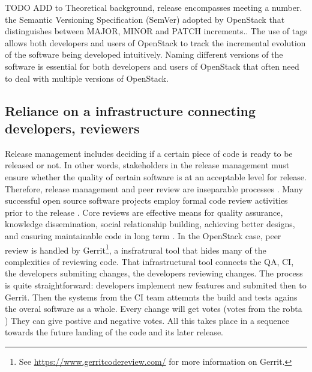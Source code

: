 \documentclass[dvipsnames]{interact}
\theoremstyle{plain}\newtheorem{theorem}{Theorem}[section]
\theoremstyle{definition}
\theoremstyle{remark}
\newenvironment{newStuff}{
    \begin{color}{Sepia}
    \begin{tabular}{|p{1.0\textwidth}|}
    \hline\\
    }
    { 
    \\\\\hline
    \end{tabular} 
    \end{color}
    }
\renewenvironment{newStuff}{}{}
\begin{document}
\begin{newStuff}




\begin{newStuff}
TODO ADD to Theoretical background,  release encompasses  meeting a number. 
the Semantic Versioning Specification (SemVer) adopted by OpenStack that distinguishes between MAJOR, MINOR and PATCH increments.. The use of tags allows both developers and users of OpenStack to track the incremental evolution of the software being developed intuitively. Naming different versions of the software is essential for both developers and users of OpenStack that often need to deal with multiple versions of OpenStack. 


 
 

\end{newStuff}






 
 
\subsection{Reliance on a infrastructure connecting developers, reviewers} 

Release management includes deciding if a certain piece of code is ready to be released or not. In other words, stakeholders in the release management must ensure whether the quality of certain software is at an acceptable level for release. Therefore, release management and peer review are inseparable processes 
\citep[]{Jrgensen2001,SharmaSugumaran_et_al2002,NarayanFinis_et_al2012,StarkOman_et_al1999}. Many successful open source software projects employ formal code review activities prior to the release \citep{Michlmayr2007}. Core reviews are effective means for quality assurance, knowledge dissemination, social relationship building, achieving better designs, and ensuring maintainable code in long term \citep{BosuCarver_et_al2017}. In the OpenStack case, peer review is handled by Gerrit\footnote{See \url {https://www.gerritcodereview.com/} for more information on Gerrit.}, a insfratrural tool that hides many of the complexities of reviewing code. That infrastructural tool connects the QA, CI, the developers submiting changes, the developers reviewing changes. The process is quite straightforward: developers implement new features and submited then to Gerrit.  Then the systems from the CI team attemnts the build and tests agains the overal software as a whole. Every change will get votes (votes from the robta ) They can give postive and negative votes. 
All this takes place in a sequence towards the future landing of the code and its later release. 


\end{newStuff}
\end{document}

